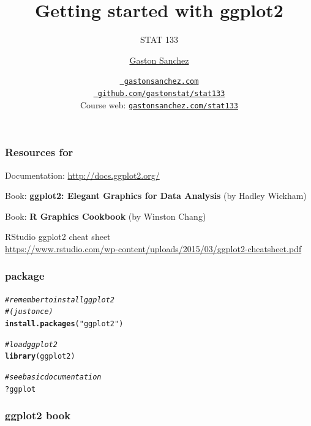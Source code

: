 \documentclass[12pt]{beamer}\usepackage[]{graphicx}\usepackage[]{color}
\title{Getting started with ggplot2}
\subtitle{STAT 133}
\author{\href{http://www.gastonsanchez.com}{Gaston Sanchez}}
\institute{Department of Statistics, UC{\textendash}Berkeley}
\date{\href{http://www.gastonsanchez.com}{\tt \scriptsize \color{foreground} gastonsanchez.com}
\\[-4pt]
\href{http://github.com/gastonstat/stat133}{\tt \scriptsize \color{foreground} github.com/gastonstat/stat133}
\\[-4pt]
{\scriptsize Course web: \href{http://www.gastonsanchez.com/stat133}{\tt gastonsanchez.com/stat133}}
}
\makeatletter
\newcommand{\hlstr}[1]{\textcolor[rgb]{0.192,0.494,0.8}{#1}}%
\newcommand{\hlcom}[1]{\textcolor[rgb]{0.678,0.584,0.686}{\textit{#1}}}%
\newcommand{\hlopt}[1]{\textcolor[rgb]{0,0,0}{#1}}%
\newcommand{\hlstd}[1]{\textcolor[rgb]{0.345,0.345,0.345}{#1}}%
\newcommand{\hlkwd}[1]{\textcolor[rgb]{0.737,0.353,0.396}{\textbf{#1}}}%
\newenvironment{kframe}{%
 \def\at@end@of@kframe{}%
 \ifinner\ifhmode%
  \def\at@end@of@kframe{\end{minipage}}%
  \begin{minipage}{\columnwidth}%
 \fi\fi%
 \def\FrameCommand##1{\hskip\@totalleftmargin \hskip-\fboxsep
 \colorbox{shadecolor}{##1}\hskip-\fboxsep
     \hskip-\linewidth \hskip-\@totalleftmargin \hskip\columnwidth}%
 \MakeFramed {\advance\hsize-\width
   \@totalleftmargin\z@ \linewidth\hsize
   \@setminipage}}%
 {\par\unskip\endMakeFramed%
 \at@end@of@kframe}
\newenvironment{knitrout}{}{} %
\makeatother
\begin{document}
{
  \frame{
    \titlepage
  } 
}


\begin{frame}
\begin{center}
\Huge{}
\end{center}
\end{frame}


\begin{frame}[fragile]
\frametitle{Resources for }

\bbi
  \item Documentation: \url{http://docs.ggplot2.org/} 
  \item Book: \textbf{ggplot2: Elegant Graphics for Data Analysis} (by Hadley Wickham)
  \item Book: \textbf{R Graphics Cookbook} (by Winston Chang)
  \item RStudio ggplot2 cheat sheet \\
  {\tiny \url{https://www.rstudio.com/wp-content/uploads/2015/03/ggplot2-cheatsheet.pdf}}
\ei

\end{frame}


\begin{frame}[fragile]
\frametitle{package }
\begin{knitrout}\footnotesize
{}\color{fgcolor}\begin{kframe}
\begin{alltt}
\hlcom{# remember to install ggplot2 }
\hlcom{# (just once)}
\hlkwd{install.packages}\hlstd{(}\hlstr{"ggplot2"}\hlstd{)}


\hlcom{# load ggplot2}
\hlkwd{library}\hlstd{(ggplot2)}


\hlcom{# see basic documentation}
\hlopt{?}\hlstd{ggplot}
\end{alltt}
\end{kframe}
\end{knitrout}



\end{frame}


\begin{frame}[fragile]
\frametitle{ggplot2 book}
\begin{center}
\end{center}
\end{frame}
\end{document}
